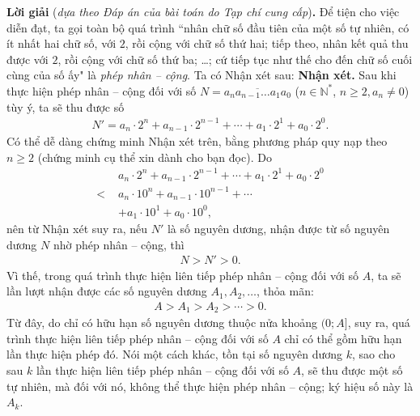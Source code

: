 \begin{multicols}{2}
	\vskip 0.05cm
	\textbf{\color{thachthuctoanhoc}Lời giải} (\textit{dựa theo Đáp án của bài toán do Tạp chí cung cấp})\textbf{\color{thachthuctoanhoc}.}
	\vskip 0.05cm
	Để tiện cho việc diễn đạt, ta gọi toàn bộ quá trình ``nhân chữ số đầu tiên của một số tự nhiên, có ít nhất hai chữ số, với $2$, rồi cộng với chữ số thứ hai; tiếp theo, nhân kết quả thu được với $2$, rồi cộng với chữ số thứ ba; \ldots; cứ tiếp tục như thế cho đến chữ số cuối cùng của số ấy" là \textit{phép nhân -- cộng}.
	\vskip 0.05cm
	Ta có Nhận xét sau:
	\vskip 0.01cm
	\textbf{\color{thachthuctoanhoc}Nhận xét.} Sau khi thực hiện phép nhân -- cộng đối với số $N \!=\! \overline {{a_n}{a_{n - 1}} \ldots {a_1}{a_0}} $ ($n \!\in\! \mathbb{N^*}$, $n \ge 2, a_n \ne 0$) tùy ý, ta sẽ thu được số
	\begin{align*}
		N' \!=\! {a_n} \!\cdot\! {2^n} \!+\! {a_{n \!-\! 1}} \!\cdot\! {2^{n \!-\! 1}} \!+\!  \!\cdots\!  +\! {a_1} \!\cdot\! {2^1} \!+\! {a_0} \!\cdot\! {2^0}.
	\end{align*}
	Có thể dễ dàng chứng minh Nhận xét trên, bằng phương pháp quy nạp theo $n \ge 2$ (chứng minh cụ thể xin dành cho bạn đọc).
	\vskip 0.01cm
	Do
	\begin{align*}
		&{a_n} \!\cdot\! {2^n} \!+\! {a_{n - 1}} \!\cdot\! {2^{n \!-\! 1}} \!+\!  \cdots  \!+\! {a_1} \!\cdot\! {2^1} \!+\! {a_0} \!\cdot\! {2^0} \\[-0.4ex]
		< \,\,&{a_n} \cdot {10^n} + {a_{n - 1}} \cdot {10^{n - 1}} +  \cdots  \\[-0.4ex]
		&+ {a_1} \cdot {10^1} + {a_0} \cdot {10^0},
	\end{align*}
	nên từ Nhận xét suy ra, nếu $N'$  là số nguyên dương, nhận được từ số nguyên dương $N$ nhờ phép nhân -- cộng, thì
	\begin{align*}
		N > N' > 0.
	\end{align*}
	Vì thế, trong quá trình thực hiện liên tiếp phép nhân -- cộng đối với số $A$, ta sẽ lần lượt nhận được các số nguyên dương   $A_1, A_2, \ldots$, thỏa mãn:
	\begin{align*}
		A > {A_1} > {A_2} >  \cdots  > 0.
	\end{align*}
	Từ đây, do chỉ có hữu hạn số nguyên dương thuộc nửa khoảng $(0; A]$, suy ra, quá trình thực hiện liên tiếp phép nhân -- cộng đối với số $A$ chỉ có thể gồm hữu hạn lần thực hiện phép đó. Nói một cách khác, tồn tại số nguyên dương $k$, sao cho sau $k$ lần thực hiện liên tiếp phép nhân -- cộng đối với số $A$, sẽ thu được một số tự nhiên, mà đối với nó, không thể thực hiện phép nhân -- cộng; ký hiệu số này là $A_k$.

\end{multicols}
